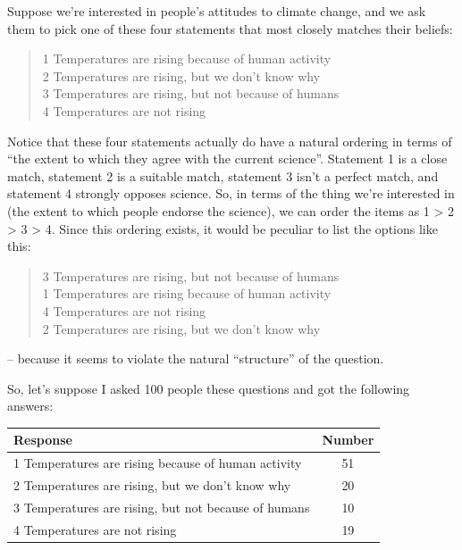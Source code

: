 \documentclass[
  11pt,
  a4paper,
  twoside,symmetric,openright]{book}
\theoremstyle{break}
\theoremstyle{break}
\begin{document}
\begin{example}
\protect\hypertarget{exm:exordinal}{}\label{exm:exordinal}Suppose we're interested in people's attitudes to climate change, and we ask them to pick one of these four statements that most closely matches their beliefs:

\begin{keepTogether}

\begin{quote}
1 Temperatures are rising because of human activity\\
2 Temperatures are rising, but we don't know why\\
3 Temperatures are rising, but not because of humans\\
4 Temperatures are not rising
\end{quote}

\end{keepTogether}

Notice that these four statements actually do have a natural ordering in terms of ``the extent to which they agree with the current science''. Statement 1 is a close match, statement 2 is a suitable match, statement 3 isn't a perfect match, and statement 4 strongly opposes science. So, in terms of the thing we're interested in (the extent to which people endorse the science), we can order the items as 1 \textgreater{} 2 \textgreater{} 3 \textgreater{} 4. Since this ordering exists, it would be peculiar to list the options like this:

\begin{keepTogether}

\begin{quote}
3 Temperatures are rising, but not because of humans\\
1 Temperatures are rising because of human activity\\
4 Temperatures are not rising\\
2 Temperatures are rising, but we don't know why
\end{quote}

\end{keepTogether}

-- because it seems to violate the natural ``structure'' of the question.

So, let's suppose I asked 100 people these questions and got the following answers:

\begin{table}[H]
\centering
\begin{tabular}{lc}
\toprule
Response & Number\\
\midrule
1 Temperatures are rising because of human activity & 51\\
2 Temperatures are rising, but we don't know why & 20\\
3 Temperatures are rising, but not because of humans & 10\\
4 Temperatures are not rising & 19\\
\bottomrule
\end{tabular}
\end{table}


\end{example}
\end{document}
